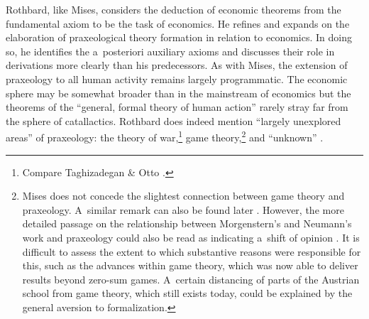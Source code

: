Rothbard, like Mises, considers the deduction of economic theorems from the fundamental axiom to be the task of economics. He refines and expands on the elaboration of praxeological theory formation in relation to economics. In doing so, he identifies the a~posteriori auxiliary axioms and discusses their role in derivations more clearly than his predecessors. As with Mises, the extension of praxeology to all human activity remains largely programmatic. The economic sphere may be somewhat broader than in the mainstream of economics but the theorems of the ``general, formal theory of human action'' 
\parencite[][p.945]{rothbard_praxeology_1951} %
 rarely stray far from the sphere of catallactics. Rothbard does indeed mention ``largely unexplored areas'' of praxeology: the theory of war,\footnote{Compare Taghizadegan \& Otto 
\parencite*[][]{}.%
} game theory,\footnote{Mises 
\parencite*[][pp.116–117]{} %
 does not concede the slightest connection between game theory and praxeology. A~similar remark can also be found later 
\parencite[][p.135]{mises_ultimate_2012}. %
 However, the more detailed passage on the relationship between Morgenstern's and Neumann's work and praxeology could also be read as indicating a~shift of opinion 
\parencite[][pp.89–90]{mises_ultimate_2012}. %
 It is difficult to assess the extent to which substantive reasons were responsible for this, such as the advances within game theory, which was now able to deliver results beyond zero-sum games. A~certain distancing of parts of the Austrian school from game theory, which still exists today, could be explained by the general aversion to formalization.} and ``unknown'' 
\parencite[][p.946]{rothbard_praxeology_1951}.%





